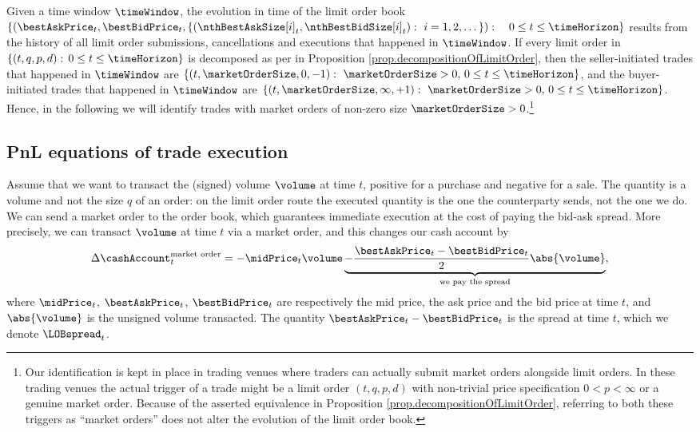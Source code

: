 Given a time window $\timeWindow$,
the evolution in time of the limit order book
$\lbrace (\bestAskPrice_t, \bestBidPrice_t,\lbrace (\nthBestAskSize[i]_t, \nthBestBidSize[i]_t) : \, \, i=1,2,\dots\rbrace): \quad 0\leq t \leq \timeHorizon \rbrace$
results from the history of all limit order submissions,
cancellations and executions that happened in $\timeWindow$.
If every limit order in $\lbrace (t,q,p,d): \, 0\leq t\leq \timeHorizon\rbrace$
is decomposed as per in Proposition \ref{prop.decompositionOfLimitOrder},
then the seller-initiated trades that happened in $\timeWindow$ are
$\lbrace (t,\marketOrderSize,0,-1):\, \, \marketOrderSize>0, \, 0\leq t\leq \timeHorizon \rbrace$,
and the buyer-initiated trades that happened in $\timeWindow$ are
$\lbrace (t,\marketOrderSize,\infty,+1):\, \, \marketOrderSize>0, \, 0\leq t\leq \timeHorizon \rbrace$.
Hence, in the following we will identify trades with market orders
of non-zero size $\marketOrderSize>0$.\footnote{
Our identification is kept in place in trading venues
where traders can actually submit market orders alongside limit orders.
In these trading venues the actual trigger of a trade might be a limit order $(t,q,p,d)$
with non-trivial price specification $0<p<\infty$ or a genuine market order.
Because of the asserted equivalence in Proposition \ref{prop.decompositionOfLimitOrder},
referring to both these triggers as ``market orders''
does not alter the evolution of the limit order book.
}

\subsection{PnL equations of trade execution}
\label{sec.pnlOfTradeExecution}

Assume that
we want to transact the (signed) volume
$\volume$
at time $t$,
positive for a purchase and negative for a sale.
The quantity is a volume and not the size $q$ of an order:
on the limit order route the executed quantity is the one the counterparty sends,
not the one we do.
We can send a market order to the order book,
which guarantees immediate execution at the cost of paying the bid-ask spread.
More precisely,
we can transact $\volume$
at time $t$
via a market order,
and this changes our cash account by
\begin{equation}
\label{eq.cashMarketOrder}
	\Delta \cashAccount_t^{\text{market order}}
	=
	-\midPrice_{t} \volume
	\underbrace{ -\frac{\bestAskPrice_t - \bestBidPrice_t}{2}\abs{\volume}}_{\text{we pay the spread}}
	,
\end{equation}
where
$\midPrice_t$,
$\bestAskPrice_t$,
$\bestBidPrice_t$
are respectively the mid price, the ask price and the bid price at time $t$,
and $\abs{\volume}$ is the unsigned volume transacted.
The quantity $\bestAskPrice_t - \bestBidPrice_t$ is the spread at time $t$,
which we denote $\LOBspread_t$.

